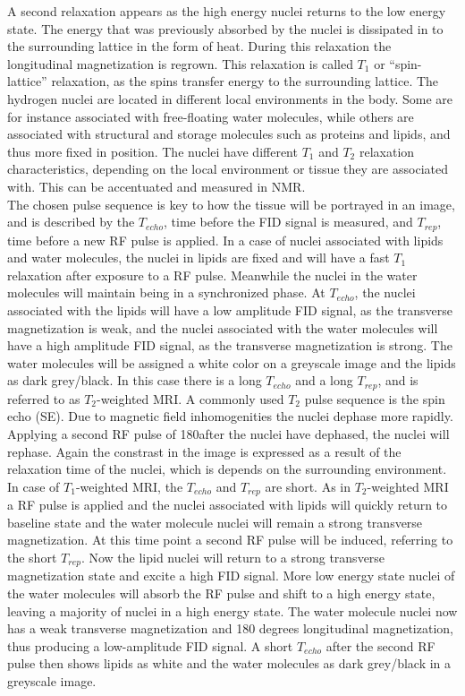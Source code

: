 A second relaxation appears as the high energy nuclei returns to the low energy state. The energy that was previously absorbed by the nuclei is dissipated in to the surrounding lattice in the form of heat. During this relaxation the longitudinal magnetization is regrown. This relaxation is called $T_1$ or “spin-lattice” relaxation, as the spins transfer energy to the surrounding lattice. \cite{Bharath2008}
The hydrogen nuclei are located in different local environments in the body. Some are for instance associated with free-floating water molecules, while others are associated with structural and storage molecules such as proteins and lipids, and thus more fixed in position. The nuclei have different $T_1$ and $T_2$ relaxation characteristics, depending on the local environment or tissue they are associated with. This can be accentuated and measured in NMR. \cite{Bharath2008} \\
The chosen pulse sequence is key to how the tissue will be portrayed in an image, and is described by the $T_{echo}$, time before the FID signal is measured, and $T_{rep}$, time before a new RF pulse is applied. In a case of nuclei associated with lipids and water molecules, the nuclei in lipids are fixed and will have a fast $T_1$ relaxation after exposure to a RF pulse. Meanwhile the nuclei in the water molecules will maintain being in a synchronized phase. At $T_{echo}$, the nuclei associated with the lipids will have a low amplitude FID signal, as the transverse magnetization is weak, and the nuclei associated with the water molecules will have a high amplitude FID signal, as the transverse magnetization is strong. The water molecules will be assigned a white color on a greyscale image and the lipids as dark grey/black. In this case there is a long $T_{echo}$ and a long $T_{rep}$, and is referred to as $T_2$-weighted MRI. A commonly used $T_2$ pulse sequence is the spin echo (SE). Due to magnetic field inhomogenities the nuclei dephase more rapidly. Applying a second RF pulse of 180\degree after the nuclei have dephased, the nuclei will rephase. Again the constrast in the image is expressed as a result of the relaxation time of the nuclei, which is depends on the surrounding environment. \cite{Bharath2008} \\
\setlength{\parindent}{0.2cm} In case of $T_1$-weighted MRI, the $T_{echo}$ and $T_{rep}$ are short. As in $T_2$-weighted MRI a RF pulse is applied and the nuclei associated with lipids will quickly return to baseline state and the water molecule nuclei will remain a strong transverse magnetization. At this time point a second RF pulse will be induced, referring to the short $T_{rep}$. Now the lipid nuclei will return to a strong transverse magnetization state and excite a high FID signal. More low energy state nuclei of the water molecules will absorb the RF pulse and shift to a high energy state, leaving a majority of nuclei in a high energy state. The water molecule nuclei now has a weak transverse magnetization and 180 degrees longitudinal magnetization, thus producing a low-amplitude FID signal. A short $T_{echo}$ after the second RF pulse then shows lipids as white and the water molecules as dark grey/black in a greyscale image. \cite{Bharath2008} \\

